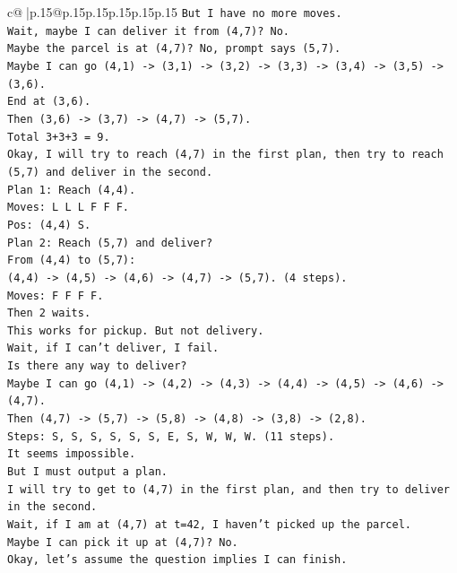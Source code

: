 \documentclass{article}
\begin{document}
{\begin{supertabular}{c@{$\;$}|p{.15\linewidth}@{}p{.15\linewidth}p{.15\linewidth}p{.15\linewidth}p{.15\linewidth}p{.15\linewidth}}
{{{\texttt{But I have no more moves.} \\
\texttt{Wait, maybe I can deliver it from (4,7)? No.} \\
\texttt{Maybe the parcel is at (4,7)? No, prompt says (5,7).} \\
\texttt{Maybe I can go (4,1) {-}> (3,1) {-}> (3,2) {-}> (3,3) {-}> (3,4) {-}> (3,5) {-}> (3,6).} \\
\texttt{End at (3,6).} \\
\texttt{Then (3,6) {-}> (3,7) {-}> (4,7) {-}> (5,7).} \\
\texttt{Total 3+3+3 = 9.} \\
\texttt{Okay, I will try to reach (4,7) in the first plan, then try to reach (5,7) and deliver in the second.} \\
\texttt{Plan 1: Reach (4,4).} \\
\texttt{Moves: L L L F F F.} \\
\texttt{Pos: (4,4) S.} \\
\texttt{Plan 2: Reach (5,7) and deliver?} \\
\texttt{From (4,4) to (5,7):} \\
\texttt{(4,4) {-}> (4,5) {-}> (4,6) {-}> (4,7) {-}> (5,7). (4 steps).} \\
\texttt{Moves: F F F F.} \\
\texttt{Then 2 waits.} \\
\texttt{This works for pickup. But not delivery.} \\
\texttt{Wait, if I can't deliver, I fail.} \\
\texttt{Is there any way to deliver?} \\
\texttt{Maybe I can go (4,1) {-}> (4,2) {-}> (4,3) {-}> (4,4) {-}> (4,5) {-}> (4,6) {-}> (4,7).} \\
\texttt{Then (4,7) {-}> (5,7) {-}> (5,8) {-}> (4,8) {-}> (3,8) {-}> (2,8).} \\
\texttt{Steps: S, S, S, S, S, S, E, S, W, W, W. (11 steps).} \\
\texttt{It seems impossible.} \\
\texttt{But I must output a plan.} \\
\texttt{I will try to get to (4,7) in the first plan, and then try to deliver in the second.} \\
\texttt{Wait, if I am at (4,7) at t=42, I haven't picked up the parcel.} \\
\texttt{Maybe I can pick it up at (4,7)? No.} \\
\texttt{Okay, let's assume the question implies I can finish.} \\
}}}
\end{supertabular}}
\end{document}
